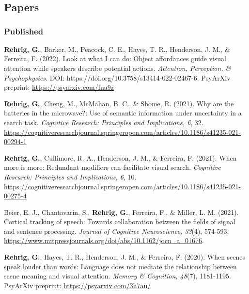\section*{}
\label{sec:pubs}

\subsection*{Papers}

\subsubsection*{Published}

\textbf{Rehrig, G.}, Barker, M., Peacock, C. E., Hayes, T. R., Henderson, J. M., \& Ferreira, F. (2022). Look at what I can do: Object affordances guide visual attention while speakers describe potential actions. \textit{Attention, Perception, \& Psychophysics}. DOI: https://doi.org/10.3758/s13414-022-02467-6. PsyArXiv preprint: \url{https://psyarxiv.com/fna9z}

\textbf{Rehrig, G.}, Cheng, M., McMahan, B. C., \& Shome, R. (2021). Why are the batteries in the microwave?: Use of semantic information under uncertainty in a search task. \textit{Cognitive Research: Principles and Implications, 6}, 32. \url{https://cognitiveresearchjournal.springeropen.com/articles/10.1186/s41235-021-00294-1}

\textbf{Rehrig, G.}, Cullimore, R. A., Henderson, J. M., \& Ferreira, F. (2021). When more is more: Redundant modifiers can facilitate visual search. \textit{Cognitive Research: Principles and Implications, 6}, 10. \url{https://cognitiveresearchjournal.springeropen.com/articles/10.1186/s41235-021-00275-4}

Beier, E. J., Chantavarin, S., \textbf{Rehrig, G.}, Ferreira, F., \& Miller, L. M. (2021). Cortical tracking of speech: Towards collaboration between the fields of signal and sentence processing. \textit{Journal of Cognitive Neuroscience, 33}(4), 574-593. \url{https://www.mitpressjournals.org/doi/abs/10.1162/jocn_a_01676}.

\textbf{Rehrig, G.}, Hayes, T. R., Henderson, J. M., \& Ferreira, F. (2020). When scenes speak louder than words: Language does not mediate the relationship between scene meaning and visual attention. \textit{Memory \& Cognition, 48}(7), 1181-1195. PsyArXiv preprint: \url{https://psyarxiv.com/3h7au/}

